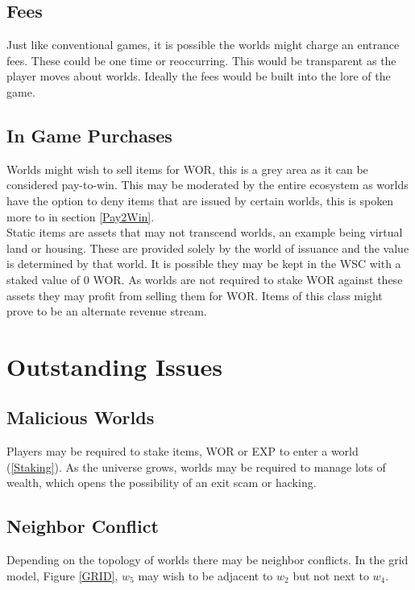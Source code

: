 \documentclass[runningheads,a4paper]{llncs}
\begin{document}
\subsection{Fees}
Just like conventional games, it is possible the worlds might charge an entrance fees. These could be one time or reoccurring. This would be transparent as the player moves about worlds. Ideally the fees would be built into the lore of the game.

\subsection{In Game Purchases}
Worlds might wish to sell items for WOR, this is a grey area as it can be considered pay-to-win. This may be  moderated by the entire ecosystem as worlds have the option to deny items that are issued by certain worlds, this is spoken more to in section \ref{Pay2Win}.\\

Static items are assets that may not transcend worlds, an example being virtual land or housing. These are provided solely by the world of issuance and the value is determined by that world. It is possible they may be kept in the WSC with a staked value of 0 WOR. As worlds are not required to stake WOR against these assets they may profit from selling them for WOR. Items of this class might prove to be an alternate revenue stream.

\section{Outstanding Issues}
\subsection{Malicious Worlds}
Players may be required to stake items, WOR or EXP to enter a world (\ref{Staking}). As the universe grows, worlds may be required to manage lots of wealth, which opens the possibility of an exit scam or hacking.

\subsection{Neighbor Conflict}
Depending on the topology of worlds there may be neighbor conflicts. In the grid model, Figure \ref{GRID}, $w_5$ may wish to be adjacent to $w_2$ but not next to $w_4$. 
\end{document}
